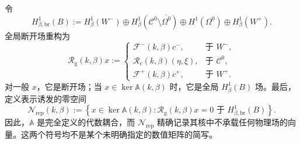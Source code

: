 \begin{definition}
令
\begin{equation}
  H^1_{\beta,\mathrm{br}}(B):=
  H^1_\beta(W^- )\oplus
  H^1_\beta(\mathcal C^0\setminus\overline{\Omega^0})
  \oplus H^1(\Omega^0)
  \oplus H^1_\beta(W^+).
  \label{eq:global-broken-space}
\end{equation}
全局断开场重构为
\begin{equation}
  \mathcal R_{\mathrm g}(k,\beta)x:=
  \begin{cases}
    \mathcal F^-(k,\beta)c^-,&\text{于 }W^-,\\
    \mathcal R_{\mathrm c}(k,\beta)(\eta,\xi),&\text{于 }\mathcal C^0,\\
    \mathcal F^+(k,\beta)c^+,&\text{于 }W^+.
  \end{cases}
  \label{eq:global-reconstruction}
\end{equation}
对一般 $x$，它是断开场；当 $x\in\ker\mathbb A(k,\beta)$ 时，它是全局 $H^1_\beta(B)$ 场。最后，定义表示诱发的零空间
\begin{equation}
  \mathcal N_{\mathrm{rep}}(k,\beta):=
  \left\{x\in\ker\mathbb A(k,\beta):
  \mathcal R_{\mathrm g}(k,\beta)x=0
  \text{ 于 }H^1_{\beta,\mathrm{br}}(B)\right\}.
  \label{eq:Nrep-definition}
\end{equation}
因此，$\mathbb A$ 是完全定义的代数耦合，而 $\mathcal N_{\mathrm{rep}}$ 精确记录其核中不承载任何物理场的向量。这两个符号均不是某个未明确指定的数值矩阵的简写。
\end{definition}
